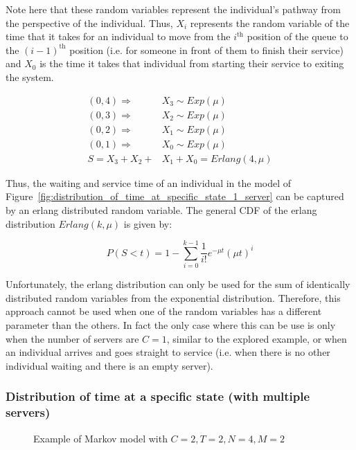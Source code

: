 Note here that these random variables represent the individual's pathway from
the perspective of the individual.
Thus, \(X_i\) represents the random variable of the time that it takes for an
individual to move from the \(i^{\text{th}}\) position of the queue to the
\((i-1)^{\text{th}}\) position (i.e. for someone in front of them to finish
their service) and \(X_0\) is the time it takes that individual from
starting their service to exiting the system.


\begin{align}
    (0,4) \Rightarrow \quad & X_3 \sim Exp(\mu) \nonumber \\
    (0,3) \Rightarrow \quad & X_2 \sim Exp(\mu) \nonumber \\
    (0,2) \Rightarrow \quad & X_1 \sim Exp(\mu) \nonumber \\
    (0,1) \Rightarrow \quad & X_0 \sim Exp(\mu) \nonumber \\
    S = X_3 + X_2 + & X_1 + X_0 = Erlang(4, \mu)
\end{align}

Thus, the waiting and service time of an individual in the model of
Figure~\ref{fig:distribution_of_time_at_specific_state_1_server}
can be captured by an
erlang distributed random variable.
The general CDF of the erlang distribution \(Erlang(k, \mu)\) is given by:

\begin{equation} \label{eq:cdf_erlang}
    P(S < t) = 1 - \sum_{i=0}^{k-1} \frac{1}{i!} e^{-\mu t} (\mu t)^i
\end{equation}

Unfortunately, the erlang distribution can only be used for the sum of
identically distributed random variables from the exponential distribution.
Therefore, this approach cannot be used when one of the random variables has a
different parameter than the others.
In fact the only case where this can be use is only when the number of servers 
are \(C=1\), similar to the explored example, or when an individual arrives
and goes straight to service (i.e. when there is no other individual waiting
and there is an empty server).


\subsubsection{Distribution of time at a specific state (with multiple servers)}

\begin{figure}[H]
    \centering
    \scalebox{0.75}{}
    \caption{Example of Markov model with \(C=2, T=2, N=4, M=2\)}
    \label{fig:distribution_of_time_at_specific_state_2_servers}
\end{figure}

